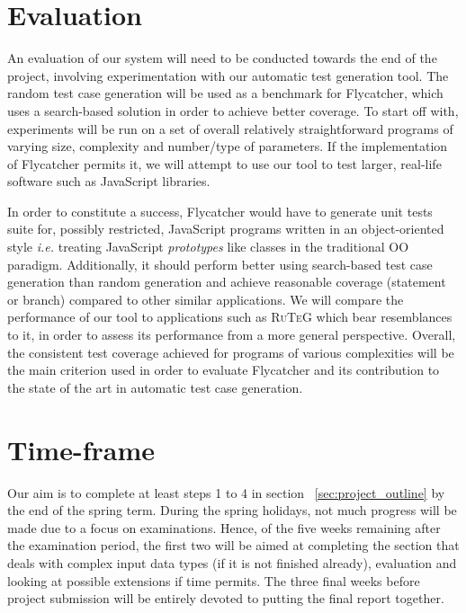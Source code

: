 \documentclass[a4paper,11pt,titlepage]{report}
\begin{document}
\section{Evaluation}

An evaluation of our system will need to be conducted towards the end of the project, involving experimentation with our automatic test generation tool. The random test case generation will be used as a benchmark for Flycatcher, which uses a search-based solution in order to achieve better coverage. To start off with, experiments will be run on a set of overall relatively straightforward programs of varying size, complexity and number/type of parameters. If the implementation of Flycatcher permits it, we will attempt to use our tool to test larger, real-life software such as JavaScript libraries.

In order to constitute a success, Flycatcher would have to generate unit tests suite for, possibly restricted, JavaScript programs written in an object-oriented style \emph{i.e.} treating JavaScript \emph{prototypes} like classes in the traditional OO paradigm. Additionally, it should perform better using search-based test case generation than random generation and achieve reasonable coverage (statement or branch) compared to other similar applications. We will compare the performance of our tool to applications such as \textsc{RuTeG} which bear resemblances to it, in order to assess its performance from a more general perspective. Overall, the consistent test coverage achieved for programs of various complexities will be the main criterion used in order to evaluate Flycatcher and its contribution to the state of the art in automatic test case generation.

\section{Time-frame}
Our aim is to complete at least steps 1 to 4 in section ~\ref{sec:project_outline} by the end of the spring term. During the spring holidays, not much progress will be made due to a focus on examinations. Hence, of the five weeks remaining after the examination period, the first two will be aimed at completing the section that deals with complex input data types (if it is not finished already), evaluation and looking at possible extensions if time permits. The three final weeks before project submission will be entirely devoted to putting the final report together.



\end{document}

